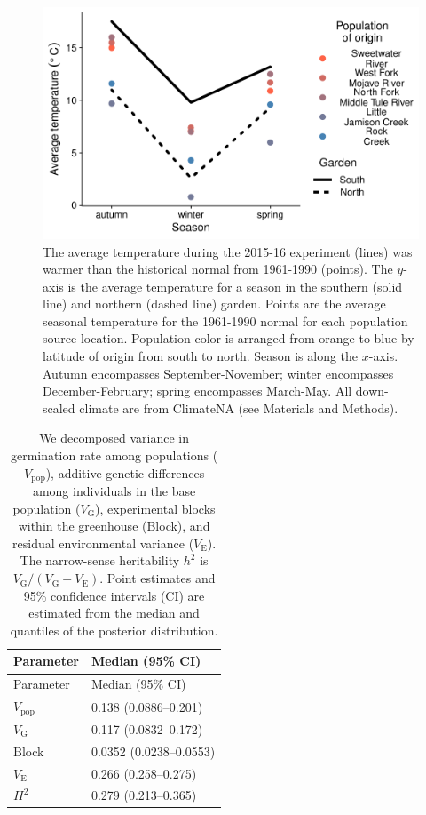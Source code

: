 \documentclass[
  12pt,
]{article}
\begin{document}
\begin{figure}[ht]
  \includegraphics[width=\textwidth]{figures/climate.pdf}
  \caption{The average temperature during the 2015-16 experiment (lines) was warmer than the historical normal from 1961-1990 (points). The $y$-axis is the average temperature for a season in the southern (solid line) and northern (dashed line) garden. Points are the average seasonal temperature for the 1961-1990 normal for each population source location. Population color is arranged from orange to blue by latitude of origin from south to north. Season is along the $x$-axis. Autumn encompasses September-November; winter encompasses December-February; spring encompasses March-May. All down-scaled climate are from ClimateNA (see Materials and Methods).}
  \label{fig:fig:climate}
\end{figure}

\clearpage

\begin{longtable}[]{@{}ll@{}}
\caption{\label{tab:vc_table_germ} We decomposed variance in germination rate among populations (\(V_\text{pop}\)), additive genetic differences among individuals in the base population (\(V_\text{G}\)), experimental blocks within the greenhouse (Block), and residual environmental variance (\(V_\text{E}\)). The narrow-sense heritability \(h^2\) is \(V_\text{G} / (V_\text{G} + V_\text{E})\). Point estimates and 95\% confidence intervals (CI) are estimated from the median and quantiles of the posterior distribution.}\tabularnewline
\toprule
Parameter & Median (95\% CI) \\
\midrule
\endfirsthead
\toprule
Parameter & Median (95\% CI) \\
\midrule
\endhead
\(V_\text{pop}\) & 0.138 (0.0886--0.201) \\
\(V_\text{G}\) & 0.117 (0.0832--0.172) \\
Block & 0.0352 (0.0238--0.0553) \\
\(V_\text{E}\) & 0.266 (0.258--0.275) \\
\(H^2\) & 0.279 (0.213--0.365) \\
\bottomrule
\end{longtable}
\end{document}
